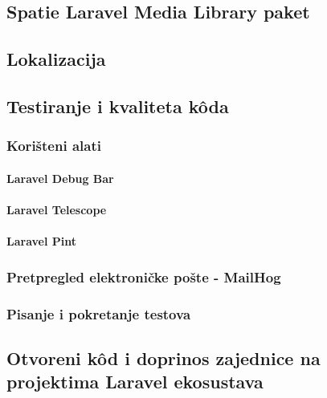 \subsection{Spatie Laravel Media Library paket}

\subsection{Lokalizacija}

\subsection{Testiranje i kvaliteta k\^oda}

\subsubsection{Korišteni alati}

\paragraph{Laravel Debug Bar}

\paragraph{Laravel Telescope}

\paragraph{Laravel Pint}

\subsubsection{Pretpregled elektroničke pošte - MailHog}

\subsubsection{Pisanje i pokretanje testova}

\subsection{Otvoreni k\^od i doprinos zajednice na projektima Laravel ekosustava}
